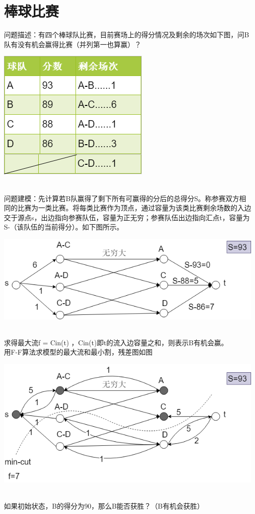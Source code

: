 \section{棒球比赛}
问题描述：有四个棒球队比赛，目前赛场上的得分情况及剩余的场次如下图，问B队有没有机会赢得比赛（并列第一也算赢）？\\
\centerline{\includegraphics[scale=0.6]{image/networkflow5.png}}
\\问题建模：先计算若B队赢得了剩下所有可赢得的分后的总得分S。称参赛双方相同的比赛为一类比赛。将每类比赛作为顶点，通过容量为该类比赛剩余场数的入边交于源点s，出边指向参赛队伍，容量为正无穷；参赛队伍出边指向汇点t，容量为S-（该队伍的当前得分）。如下图所示。\\
\centerline{\includegraphics[scale=0.6]{image/networkflow6.png}}
\\求得最大流f = Cin(t) ，Cin(t)即t的流入边容量之和，则表示B有机会赢。
\\用F-F算法求模型的最大流和最小割，残差图如图\\
\centerline{\includegraphics[scale=0.6]{image/networkflow7.png}}
\\如果初始状态，B的得分为90，那么B能否获胜？（B有机会获胜）


